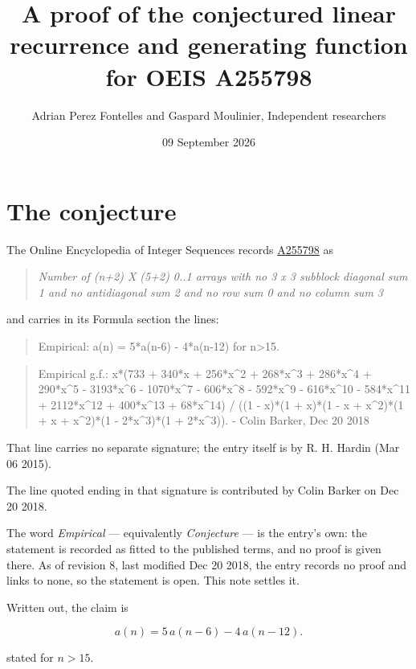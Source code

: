 \documentclass[11pt]{article}
\title{A proof of the conjectured linear recurrence and generating function for OEIS A255798}
\author{Adrian Perez Fontelles and Gaspard Moulinier, Independent researchers}
\date{09 September 2026}
\theoremstyle{definition}
\begin{document}
\maketitle
\section{The conjecture}

The Online Encyclopedia of Integer Sequences records \href{https://oeis.org/A255798}{A255798} as

\begin{quote}\itshape Number of (n+2) X (5+2) 0..1 arrays with no 3 x 3 subblock diagonal sum 1 and no antidiagonal sum 2 and no row sum 0 and no column sum 3\end{quote}

and carries in its Formula section the lines:

\begin{quote}\ttfamily Empirical: a(n) = 5*a(n-6) - 4*a(n-12) for n>15.\end{quote}

\begin{quote}\ttfamily Empirical g.f.: x*(733 + 340*x + 256*x\textasciicircum{}2 + 268*x\textasciicircum{}3 + 286*x\textasciicircum{}4 + 290*x\textasciicircum{}5 - 3193*x\textasciicircum{}6 - 1070*x\textasciicircum{}7 - 606*x\textasciicircum{}8 - 592*x\textasciicircum{}9 - 616*x\textasciicircum{}10 - 584*x\textasciicircum{}11 + 2112*x\textasciicircum{}12 + 400*x\textasciicircum{}13 + 68*x\textasciicircum{}14) / ((1 - x)*(1 + x)*(1 - x + x\textasciicircum{}2)*(1 + x + x\textasciicircum{}2)*(1 - 2*x\textasciicircum{}3)*(1 + 2*x\textasciicircum{}3)). - Colin Barker, Dec 20 2018\end{quote}

That line carries no separate signature; the entry itself is by R. H. Hardin (Mar 06 2015).

The line quoted ending in that signature is contributed by Colin Barker on Dec 20 2018.

The word {\itshape Empirical} --- equivalently {\itshape Conjecture} --- is the entry's own: the statement is recorded as fitted to the published terms, and no proof is given there. As of revision 8, last modified Dec 20 2018, the entry records no proof and links to none, so the statement is open. This note settles it.

Written out, the claim is

\[a(n) = 5\,a(n-6) - 4\,a(n-12).\]

stated for $n > 15$.
\end{document}
